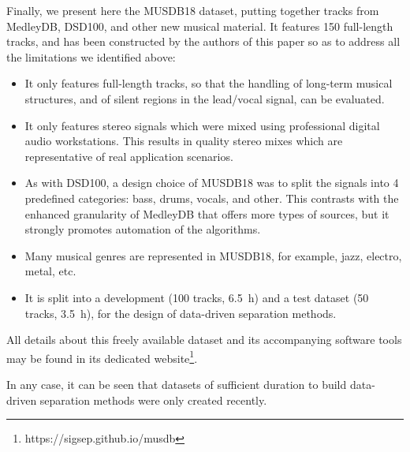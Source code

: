 Finally, we present here the MUSDB18 dataset, putting together tracks from MedleyDB, DSD100, and other new musical material. It features 150 full-length tracks, and has been constructed by the authors of this paper so as to address all the limitations we identified above:
\begin{itemize}[leftmargin=*]
  \item It only features full-length tracks, so that the handling of long-term musical structures, and of silent regions in the lead/vocal signal, can be evaluated.
  \item It only features stereo signals which were mixed using professional digital audio workstations. This results in quality stereo mixes which are representative of real application scenarios.
  \item As with DSD100, a design choice of MUSDB18 was to split the signals into 4 predefined categories: bass, drums, vocals, and other. This contrasts with the enhanced granularity of MedleyDB that offers more types of sources, but it strongly promotes automation of the algorithms.
  \item Many musical genres are represented in MUSDB18, for example, jazz, electro, metal, etc.
  \item It is split into a development (100 tracks, 6.5~h) and a test dataset (50 tracks, 3.5~h), for the design of data-driven separation methods.
\end{itemize}

All details about this freely available dataset and its accompanying software tools may be found in its dedicated website\footnote{https://sigsep.github.io/musdb}.

In any case, it can be seen that datasets of sufficient duration to build data-driven separation methods were only created recently.

